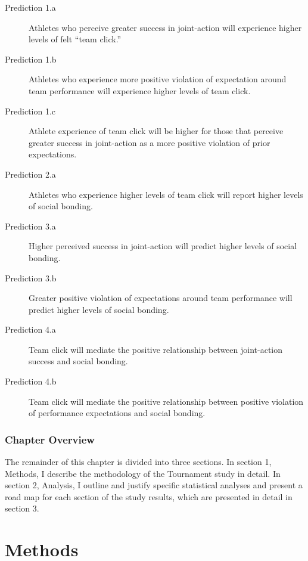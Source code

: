 \documentclass[12pt]{report}
\begin{document}
\begin{indent}
\begin{description}
  \item [Prediction 1.a] Athletes who perceive greater success in joint-action will experience higher levels of felt  ``team click.''
  \item [Prediction 1.b] Athletes who experience more positive violation of expectation around team performance will experience higher levels of team click.
  \item [Prediction 1.c] Athlete experience of team click will be higher for those that perceive greater success in joint-action as a more positive violation of prior expectations. \\

  \item [Prediction 2.a] Athletes who experience higher levels of team click will report higher levels of social bonding. \\
  \bigskip
  \item [Prediction 3.a] Higher perceived success in joint-action will predict higher levels of social bonding.
 \item [Prediction 3.b] Greater positive violation of expectations around team performance will predict higher levels of social bonding.
  \item [Prediction 4.a] Team click will mediate the positive relationship between joint-action success and social bonding.
  \item [Prediction 4.b] Team click will mediate the positive relationship between positive violation of performance expectations and social bonding.

\end{description}
\end{indent}

\subsubsection{Chapter Overview}
The remainder of this chapter is divided into three sections. In section 1, Methods, I describe the methodology of the Tournament study in detail. In section 2, Analysis, I outline and justify specific statistical analyses and present a road map for each section of the study results, which are presented in detail in section 3.
\clearpage

\section{Methods}
\end{document}
